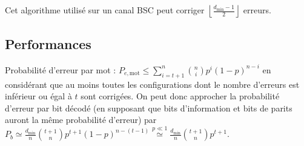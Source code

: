 	Cet algorithme utilisé sur un canal BSC peut corriger $\left\lfloor \frac{d_{\min} - 1}{2} \right\rfloor$ erreurs.


\subsection{Performances}

	Probabilité d'erreur par mot : $P_{e,\text{mot}} \leq \sum_{i = t + 1}^n \binom{n}{i} p^i (1 - p)^{n - i}$ en considérant que au moins toutes les configurations dont le nombre d'erreurs est inférieur ou égal à $t$ sont corrigées.
	On peut donc approcher la probabilité d'erreur par bit décodé (en supposant que bits d'information et bits de parits auront la même probabilité d'erreur) par $P_b \simeq \frac{d_{\min}}{n} \binom{t + 1}{n} p^{t + 1} (1 - p)^{n - (t - 1)} \overset{p \ll 1}{\simeq} \frac{d_{\min}}{n} \binom{t + 1}{n} p^{t + 1}$.